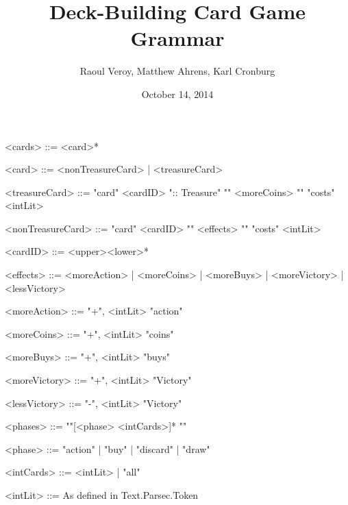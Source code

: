 \documentclass{article}
\title{Deck-Building Card Game Grammar}
\author{Raoul Veroy, Matthew Ahrens, Karl Cronburg}
\date{October 14, 2014}
\begin{document}
\maketitle
\thispagestyle{empty}

\begin{grammar}
<cards> ::= <card>*

<card>        ::= <nonTreasureCard> | <treasureCard>

<treasureCard> ::= "card" <cardID> ":: Treasure" "{" <moreCoins> "}" "costs" <intLit>

<nonTreasureCard> ::= "card" <cardID> "{" <effects> "}" "costs" <intLit>

<cardID>      ::= <upper><lower>*

<effects>     ::= <moreAction> | <moreCoins> | <moreBuys> | <moreVictory>  | <lessVictory>

<moreAction>  ::= "+", <intLit> "action"  

<moreCoins>   ::= "+", <intLit> "coins"  

<moreBuys>    ::= "+", <intLit> "buys"  

<moreVictory> ::= "+", <intLit> "Victory"  

<lessVictory> ::= "-", <intLit> "Victory"  

<phases> ::= "{"[<phase> <intCards>]* "}"

<phase> ::= "action" | "buy" | "discard" | "draw"

<intCards> ::= <intLit> | "all"

<intLit>      ::= As defined in Text.Parsec.Token

%
% 
% 
% 
\end{grammar}
\end{document}
